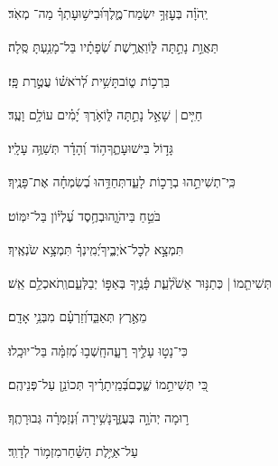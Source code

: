 \documentclass[12pt]{article}
\newcommand{\loc}[1]{\textsuperscript{\locf{#1}}}
\begin{document}
{\loc{ ב}~}‏יְֽהֹוָ֗ה בְּעׇזְּךָ֥ יִשְׂמַח־מֶ֑לֶךְ{\hfill}וּ֝בִישׁ֥וּעָתְךָ֗ מַה־ מְאֹֽד׃\par

{\loc{ ג}~}‏תַּאֲוַ֣ת  נָתַ֣תָּה לּ֑וֹ{\hfill}וַאֲרֶ֥שֶׁת שְׂ֝פָתָ֗יו בַּל־מָנַ֥עְתָּ סֶּֽלָה׃\par

{\loc{ ד}~}‏ בִּרְכ֣וֹת ט֑וֹב{\hfill}תָּשִׁ֥ית לְ֝רֹאשׁ֗וֹ עֲטֶ֣רֶת פָּֽז׃\par

{\loc{ ה}~}‏חַיִּ֤ים |  שָׁאַ֣ל  נָתַ֣תָּה לּ֑וֹ{\hfill}אֹ֥רֶךְ יָ֝מִ֗ים עוֹלָ֥ם וָעֶֽד׃\par

{\loc{ ו}~}‏גָּד֣וֹל  בִּישׁוּעָתֶ֑ךָ{\hfill}ה֥וֹד וְ֝הָדָ֗ר תְּשַׁוֶּ֥ה עָלָֽיו׃\par

{\loc{ ז}~}‏כִּֽי־תְשִׁיתֵ֣הוּ בְרָכ֣וֹת לָעַ֑ד{\hfill}תְּחַדֵּ֥הוּ בְ֝שִׂמְחָ֗ה אֶת־פָּנֶֽיךָ׃\par

{\loc{ ח}~}‏ בֹּטֵ֣חַ בַּיהֹוָ֑ה{\hfill}וּבְחֶ֥סֶד עֶ֝לְי֗וֹן בַּל־יִמּֽוֹט׃\par

{\loc{ ט}~}‏תִּמְצָ֣א  לְכׇל־אֹיְבֶ֑יךָ{\hfill}יְ֝מִֽינְךָ֗ תִּמְצָ֥א שֹׂנְאֶֽיךָ׃\par

{\loc{ י}~}‏תְּשִׁיתֵ֤מוֹ |  כְּתַנּ֥וּר אֵשׁ֮{\hfill}לְעֵ֢ת פָּ֫נֶ֥יךָ\newline\hspace*{.5em} בְּאַפּ֣וֹ יְבַלְּעֵ֑ם{\hfill}וְֽתֹאכְלֵ֥ם אֵֽשׁ׃\par

{\loc{ יא}~}‏ מֵאֶ֣רֶץ תְּאַבֵּ֑ד{\hfill}וְ֝זַרְעָ֗ם מִבְּנֵ֥י אָדָֽם׃\par

{\loc{ יב}~}‏כִּי־נָט֣וּ עָלֶ֣יךָ רָעָ֑ה{\hfill}חָֽשְׁב֥וּ מְ֝זִמָּ֗ה בַּל־יוּכָֽלוּ׃\par

{\loc{ יג}~}‏כִּ֭י תְּשִׁיתֵ֣מוֹ שֶׁ֑כֶם{\hfill}בְּ֝מֵֽיתָרֶ֗יךָ תְּכוֹנֵ֥ן עַל־פְּנֵיהֶֽם׃\par

{\loc{ יד}~}‏ר֣וּמָה יְהֹוָ֣ה בְּעֻזֶּ֑ךָ{\hfill}נָשִׁ֥ירָה וּֽ֝נְזַמְּרָ֗ה גְּבוּרָתֶֽךָ׃\par\pend
\ledpb
\pstart[\subsection*{\textcolor{red}{פרק כב}}]\label{פרק כב}
{\loc{ א}~}‏ עַל־אַיֶּ֥לֶת הַשַּׁ֗חַר{\hfill}מִזְמ֥וֹר לְדָוִֽד׃\par
\end{document}
